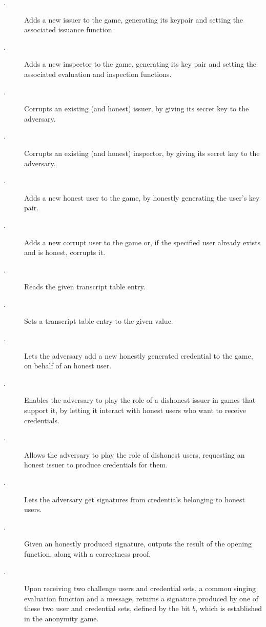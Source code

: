 \begin{description}
\item[\IGEN.] Adds a new issuer to the game, generating its keypair and setting
  the associated issuance function.
\item[\OGEN.] Adds a new inspector to the game, generating its key pair and
  setting the associated evaluation and inspection functions.
\item[\ICORR.] Corrupts an existing (and honest) issuer, by giving its secret
  key to the adversary.
\item[\OCORR.] Corrupts an existing (and honest) inspector, by giving its secret
  key to the adversary.  
\item[\HUGEN.] Adds a new honest user to the game, by honestly generating
  the user's key pair.
\item[\CUGEN.] Adds a new corrupt user to the game or, if the specified
  user already exists and is honest, corrupts it.
\item[\RREG.] Reads the given transcript table entry.
\item[\WREG.] Sets a transcript table entry to the given value.
\item[\OBTISS.] Lets the adversary add a new honestly generated credential to
  the game, on behalf of an honest user.
\item[\OBTAIN.] Enables the adversary to play the role of a dishonest issuer
  in games that support it, by letting it interact with honest users who want to
  receive credentials.
\item[\ISSUE.] Allows the adversary to play the role of dishonest users,
  requesting an honest issuer to produce credentials for them.
\item[\SIGN.] Lets the adversary get signatures from credentials belonging
  to honest users.
\item[\OPEN.] Given an honestly produced signature, outputs the result of the
  opening function, along with a correctness proof.
\item[\CHALb.] Upon receiving two challenge users and credential sets, a common
  singing evaluation function and a message, returns a signature produced by one
  of these two user and credential sets, defined by the bit $b$, which is
  established in the anonymity game.
\end{description}

